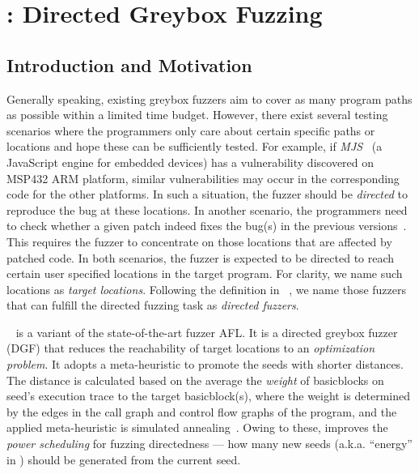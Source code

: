 
\chapter{\dFOT: Directed Greybox Fuzzing} \label{ch:dfot}


\section{Introduction and Motivation}


Generally speaking, existing greybox fuzzers aim to cover as many program paths as possible within a limited time budget.
However, there exist several testing scenarios where the programmers only care about certain specific paths or locations and hope these can be sufficiently tested. 
For example, if \emph{MJS}~\cite{mjs} (a JavaScript engine for embedded devices) has a vulnerability discovered on MSP432 ARM platform, similar vulnerabilities may occur in the corresponding code for the other platforms.
In such a situation, the fuzzer should be \emph{directed} to reproduce the bug at these locations.
In another scenario, the programmers need to check whether a given patch indeed fixes the bug(s) in the previous versions~\cite{ase18:cldiff,SemSlice,fse16:bingo,usec20:HotPatch}. 
This requires the fuzzer to concentrate on those locations that are affected by patched code.
In both scenarios, the fuzzer is expected to be directed to reach certain user specified locations in the target program.
For clarity, we name such locations as \emph{target locations}.
Following the definition in {\aflgo}~\cite{Bohme:2017:DGF}, we name those fuzzers that can fulfill the directed fuzzing task as \emph{directed fuzzers}.


{\aflgo}~\cite{Bohme:2017:DGF} is a variant of the state-of-the-art fuzzer AFL. It is a directed greybox fuzzer (DGF) that reduces the reachability of target locations to an \emph{optimization problem}. It adopts a meta-heuristic to promote the  seeds with shorter distances. The distance is calculated based on the average the \emph{weight} of basicblocks on seed's execution trace to the target basicblock(s), where the weight
 is determined by the edges in the call graph and control flow graphs of the program, and the applied meta-heuristic is simulated annealing~\cite{kirkpatrick1983optimization}.
Owing to these, \aflgo improves the \emph{power scheduling} for fuzzing directedness --- how many new seeds (a.k.a. ``energy'' in \aflgo) should be generated from the current seed.

